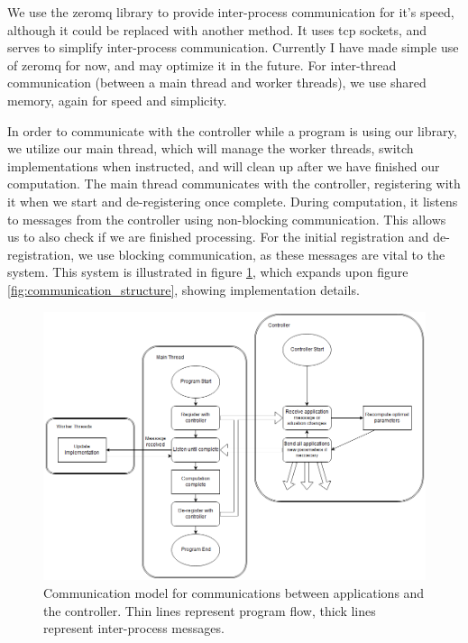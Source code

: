 We use the zeromq library to provide inter-process communication for it's speed, although it could be replaced with another method. It uses tcp sockets, and serves to simplify inter-process communication. Currently I have made simple use of zeromq for now, and may optimize it in the future. For inter-thread communication (between a main thread and worker threads), we use shared memory, again for speed and simplicity.

In order to communicate with the controller while a program is using our library, we utilize our main thread, which will manage the worker threads, switch implementations when instructed, and will clean up after we have finished our computation. The main thread communicates with the controller, registering with it when we start and de-registering once complete. During computation, it listens to messages from the controller using non-blocking communication. This allows us to also check if we are finished processing. For the initial registration and de-registration, we use blocking communication, as these messages are vital to the system. This system is illustrated in figure \ref{fig:controller_flowchart}, which expands upon figure \ref{fig:communication_structure}, showing implementation details.



\begin{figure}
	\centering
	\includegraphics[width=\textwidth]{graphics/controller_communication_flowchart.png}
	\caption{Communication model for communications between applications and the controller. Thin lines represent program flow, thick lines represent inter-process messages.}
	\label{fig:controller_flowchart}
\end{figure}



